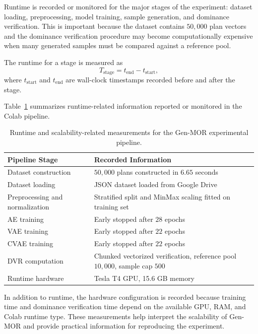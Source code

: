 Runtime is recorded or monitored for the major stages of the experiment: dataset loading, preprocessing, model training, sample generation, and dominance verification. This is important because the dataset contains $50{,}000$ plan vectors and the dominance verification procedure may become computationally expensive when many generated samples must be compared against a reference pool.

The runtime for a stage is measured as
\begin{equation}
    T_{\text{stage}}
    =
    t_{\text{end}} - t_{\text{start}},
    \label{eq:runtime_stage}
\end{equation}
where $t_{\text{start}}$ and $t_{\text{end}}$ are wall-clock timestamps recorded before and after the stage.

Table~\ref{tab:runtime_measurements} summarizes runtime-related information reported or monitored in the Colab pipeline.

\begin{table}[H]
\centering
\caption{Runtime and scalability-related measurements for the Gen-MOR experimental pipeline.}
\label{tab:runtime_measurements}
\begin{tabularx}{\textwidth}{lX}
\hline
\textbf{Pipeline Stage} & \textbf{Recorded Information} \\
\hline
Dataset construction & $50{,}000$ plans constructed in $6.65$ seconds \\
Dataset loading & JSON dataset loaded from Google Drive \\
Preprocessing and normalization & Stratified split and MinMax scaling fitted on training set \\
AE training & Early stopped after $28$ epochs \\
VAE training & Early stopped after $22$ epochs \\
CVAE training & Early stopped after $22$ epochs \\
DVR computation & Chunked vectorized verification, reference pool $10{,}000$, sample cap $500$ \\
Runtime hardware & Tesla T4 GPU, 15.6 GB memory \\
\hline
\end{tabularx}
\end{table}

In addition to runtime, the hardware configuration is recorded because training time and dominance verification time depend on the available GPU, RAM, and Colab runtime type. These measurements help interpret the scalability of Gen-MOR and provide practical information for reproducing the experiment.